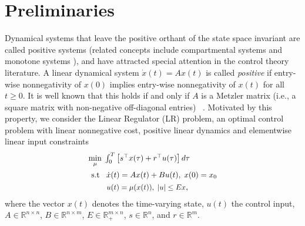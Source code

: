 \documentclass[letterpaper, 10 pt, conference]{ieeeconf}
\theoremstyle{definition}
\begin{document}
\section{Preliminaries}
Dynamical systems that leave the positive orthant of the state space invariant are called positive systems (related concepts include compartmental systems and monotone systems \cite{Angeli}), and have attracted special attention in the control theory literature. 
A linear dynamical system $\dot x(t)=Ax(t)$ is called \emph{positive} if entry-wise nonnegativity of $x(0)$ implies entry-wise nonnegativity of $x(t)$ for all $t\geq 0$. It is well known that this holds if and only if $A$ is a Metzler matrix (i.e., a square matrix with non-negative off-diagonal entries) ~\cite[Thm. 2.5]{Kaczorek}.
Motivated by this property, we consider the Linear Regulator (LR) problem, an optimal control problem with linear nonnegative cost, positive linear dynamics and elementwise linear input constraints
\begin{align}\label{LR_optprob}
    &\scalebox{.95}{$\underset{\mu}{\min} \hspace{1mm} \int_{0}^{T} \left [ s^{\top}x(\tau) +r^{\top}u(\tau)\right ]d\tau$} \notag \\
            &~\scalebox{.95}{$\mathrm{s.t} \hspace{3mm} \dot x(t)=Ax(t)+Bu(t), \hspace{1mm} x(0)=x_{0}$} \\
        &~~~~~~\hspace{0.7mm}\scalebox{.9}{$u(t)=\mu(x(t)), \hspace{1mm} \left | u \right | \leq E x$}, \notag
\end{align}
where the vector $x(t)$ denotes the time-varying state, $ u(t)$ the control input, $A \in \mathbb R^{n\times n}$, $B \in \mathbb R^{n\times m}$, $E \in \mathbb R^{m\times n}_+$, $s\in \mathbb R^n$, and $r \in \mathbb R^m$. 
\end{document}
